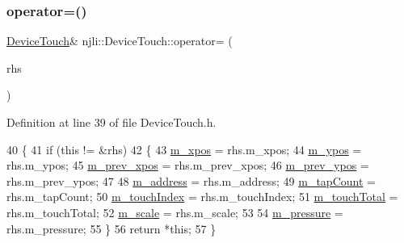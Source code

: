 \subsubsection{\texorpdfstring{operator=()}{operator=()}}
{\footnotesize\ttfamily \mbox{\hyperlink{classnjli_1_1_device_touch}{Device\+Touch}}\& njli\+::\+Device\+Touch\+::operator= (\begin{DoxyParamCaption}\item[{const \mbox{\hyperlink{classnjli_1_1_device_touch}{Device\+Touch}} \&}]{rhs }\end{DoxyParamCaption})\hspace{0.3cm}{\ttfamily [inline]}}



Definition at line 39 of file Device\+Touch.\+h.


\begin{DoxyCode}
40     \{
41       \textcolor{keywordflow}{if} (\textcolor{keyword}{this} != &rhs)
42         \{
43           \mbox{\hyperlink{classnjli_1_1_device_touch_aa459469f52287f2085402117c13512f8}{m\_xpos}} = rhs.m\_xpos;
44           \mbox{\hyperlink{classnjli_1_1_device_touch_aec3c40c2adb1ba1bf5a13bf366bd3b6d}{m\_ypos}} = rhs.m\_ypos;
45           \mbox{\hyperlink{classnjli_1_1_device_touch_aefd5c83cec6edc7dcb7edeec2144c470}{m\_prev\_xpos}} = rhs.m\_prev\_xpos;
46           \mbox{\hyperlink{classnjli_1_1_device_touch_adc6f1bce3fa81e81f1a01ca55b2b3db7}{m\_prev\_ypos}} = rhs.m\_prev\_ypos;
47 
48           \mbox{\hyperlink{classnjli_1_1_device_touch_adf8b9a7a96b90d0639aca0b9982a95d7}{m\_address}} = rhs.m\_address;
49           \mbox{\hyperlink{classnjli_1_1_device_touch_af4506b66dcc8e44597244c9a6827bd0d}{m\_tapCount}} = rhs.m\_tapCount;
50           \mbox{\hyperlink{classnjli_1_1_device_touch_a8702a0eb417f912b2b8733b2f21a8060}{m\_touchIndex}} = rhs.m\_touchIndex;
51           \mbox{\hyperlink{classnjli_1_1_device_touch_ad36aeb2b221ff37cf29d6b5f837d0d93}{m\_touchTotal}} = rhs.m\_touchTotal;
52           \mbox{\hyperlink{classnjli_1_1_device_touch_ae07cde00eac9eb6e816f261bdb0df9d4}{m\_scale}} = rhs.m\_scale;
53 
54           \mbox{\hyperlink{classnjli_1_1_device_touch_a1fbc998f1460afc213b0ba31410599bd}{m\_pressure}} = rhs.m\_pressure;
55         \}
56       \textcolor{keywordflow}{return} *\textcolor{keyword}{this};
57     \}
\end{DoxyCode}
\mbox{\label{classnjli_1_1_device_touch_af37ae2aa3c4b1bb24a1f69e32a0cd659}} 
